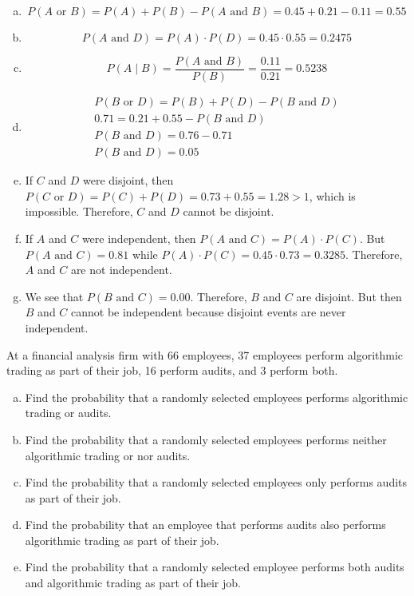 \documentclass[11pt,letterpaper]{article}
\begin{document}
\sol
\begin{enumerate}[(a)]
\item 
	\[
	P(A \text{ or }B)= P(A) + P(B) - P(A \text{ and }B)= 0.45 + 0.21 - 0.11= 0.55
	\]

\item 
	\[
	P(A \text{ and }D)= P(A) \cdot P(D)= 0.45 \cdot 0.55= 0.2475
	\]

\item 
	\[
	P(A \;|\; B)= \dfrac{P(A \text{ and }B)}{P(B)}= \dfrac{0.11}{0.21}= 0.5238
	\]

\item 
	\[
	\begin{gathered}
	P(B \text{ or }D)= P(B) + P(D) - P(B \text{ and }D) \\
	0.71= 0.21 + 0.55 - P(B \text{ and }D) \\
	P(B \text{ and }D)= 0.76 - 0.71 \\
	P(B \text{ and }D)= 0.05
	\end{gathered}
	\]

\item If $C$ and $D$ were disjoint, then $P(C \text{ or }D)= P(C) + P(D)= 0.73 + 0.55= 1.28 > 1$, which is impossible. Therefore, $C$ and $D$ cannot be disjoint. 

\item If $A$ and $C$ were independent, then $P(A \text{ and }C)= P(A) \cdot P(C)$. But $P(A \text{ and }C)= 0.81$ while $P(A) \cdot P(C)= 0.45 \cdot 0.73= 0.3285$. Therefore, $A$ and $C$ are not independent. 

\item We see that $P(B \text{ and }C)= 0.00$. Therefore, $B$ and $C$ are disjoint. But then $B$ and $C$ cannot be independent because disjoint events are never independent. 
\end{enumerate}





\newpage





 At a financial analysis firm with 66 employees, 37 employees perform algorithmic trading as part of their job, 16 perform audits, and 3 perform both. 
        \begin{enumerate}[(a)]
        \item Find the probability that a randomly selected employees performs algorithmic trading or audits. 
        \item Find the probability that a randomly selected employees performs neither algorithmic trading or nor audits. 
        \item Find the probability that a randomly selected employees only performs audits as part of their job.
        \item Find the probability that an employee that performs audits also performs algorithmic trading as part of their job. 
        \item Find the probability that a randomly selected employee performs both audits and algorithmic trading as part of their job. 
        \end{enumerate} 
\end{document}
